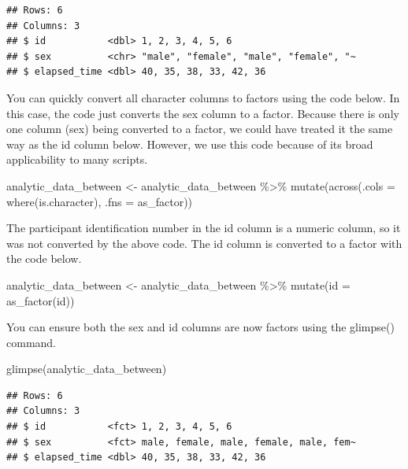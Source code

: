\documentclass[
]{krantz}
\makeatletter
\newenvironment{Shaded}{\begin{snugshade}}{\end{snugshade}}
\newcommand{\AttributeTok}[1]{\textcolor[rgb]{0.61,0.61,0.61}{#1}}
\newcommand{\FunctionTok}[1]{\textcolor[rgb]{0,0,0}{#1}}
\newcommand{\NormalTok}[1]{#1}
\newcommand{\OtherTok}[1]{\textcolor[rgb]{0.37,0.37,0.37}{#1}}
\newcommand{\SpecialCharTok}[1]{\textcolor[rgb]{0,0,0}{#1}}
\newenvironment{kframe}{%
\medskip{}
\setlength{\fboxsep}{.8em}
 \def\at@end@of@kframe{}%
 \ifinner\ifhmode%
  \def\at@end@of@kframe{\end{minipage}}%
  \begin{minipage}{\columnwidth}%
 \fi\fi%
 \def\FrameCommand##1{\hskip\@totalleftmargin \hskip-\fboxsep
 \colorbox{shadecolor}{##1}\hskip-\fboxsep
     \hskip-\linewidth \hskip-\@totalleftmargin \hskip\columnwidth}%
 \MakeFramed {\advance\hsize-\width
   \@totalleftmargin\z@ \linewidth\hsize
   \@setminipage}}%
 {\par\unskip\endMakeFramed%
 \at@end@of@kframe}
\renewenvironment{Shaded}{\begin{kframe}}{\end{kframe}}
\makeatother
\begin{document}
\begin{verbatim}
## Rows: 6
## Columns: 3
## $ id           <dbl> 1, 2, 3, 4, 5, 6
## $ sex          <chr> "male", "female", "male", "female", "~
## $ elapsed_time <dbl> 40, 35, 38, 33, 42, 36
\end{verbatim}

You can quickly convert all character columns to factors using the code below. In this case, the code just converts the sex column to a factor. Because there is only one column (sex) being converted to a factor, we could have treated it the same way as the id column below. However, we use this code because of its broad applicability to many scripts.

\begin{Shaded}
\begin{Highlighting}[]
\NormalTok{analytic\_data\_between }\OtherTok{\textless{}{-}}\NormalTok{ analytic\_data\_between }\SpecialCharTok{\%\textgreater{}\%}
  \FunctionTok{mutate}\NormalTok{(}\FunctionTok{across}\NormalTok{(}\AttributeTok{.cols =} \FunctionTok{where}\NormalTok{(is.character),}
                \AttributeTok{.fns =}\NormalTok{ as\_factor))}
\end{Highlighting}
\end{Shaded}

The participant identification number in the id column is a numeric column, so it was not converted by the above code. The id column is converted to a factor with the code below.

\begin{Shaded}
\begin{Highlighting}[]
\NormalTok{analytic\_data\_between }\OtherTok{\textless{}{-}}\NormalTok{ analytic\_data\_between }\SpecialCharTok{\%\textgreater{}\%}
  \FunctionTok{mutate}\NormalTok{(}\AttributeTok{id =} \FunctionTok{as\_factor}\NormalTok{(id))}
\end{Highlighting}
\end{Shaded}

You can ensure both the sex and id columns are now factors using the glimpse() command.

\begin{Shaded}
\begin{Highlighting}[]
\FunctionTok{glimpse}\NormalTok{(analytic\_data\_between)}
\end{Highlighting}
\end{Shaded}

\begin{verbatim}
## Rows: 6
## Columns: 3
## $ id           <fct> 1, 2, 3, 4, 5, 6
## $ sex          <fct> male, female, male, female, male, fem~
## $ elapsed_time <dbl> 40, 35, 38, 33, 42, 36
\end{verbatim}
\end{document}
